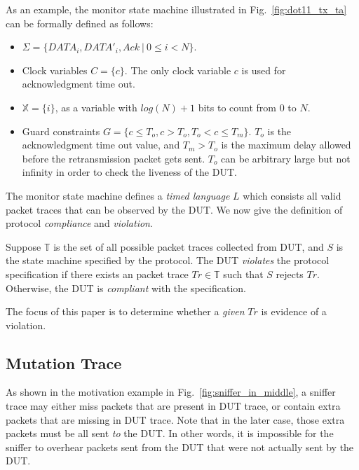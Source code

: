 As an example, the monitor state machine illustrated in
Fig.~\ref{fig:dot11_tx_ta} can be formally defined as follows:

\begin{itemize}
  \item $\Sigma = \{DATA_i, DATA'_i, Ack\ |\ 0 \le i < N\}$.
  \item Clock variables $C = \{c\}$. The only clock variable $c$ is
    used for acknowledgment time out.
  \item $\mathbb{X} = \{i\}$, as a variable with ${\mathit log}(N) + 1$ bits to count from $0$ to $N$.  
  \item Guard constraints $G = \{ c \le T_o, c > T_o, T_o < c \le T_m\}$.
    $T_o$ is the acknowledgment time out value, and $T_m >
    T_o$ is the maximum delay allowed before the retransmission packet gets
    sent. $T_o$ can be arbitrary large but not infinity in order to check the
    liveness of the DUT.
\end{itemize}


The monitor state machine defines a \textit{timed language} $L$ which consists
all valid packet traces that can be observed by the DUT.  We now give the
definition of protocol \textit{compliance} and \textit{violation}.

\begin{definition}
  Suppose $\mathbb{T}$ is the set of all possible packet traces collected from
  DUT, and $S$ is the state machine specified by the protocol. The DUT
  \textit{violates} the protocol specification if there exists an
  packet trace $Tr \in \mathbb{T}$ such that $S$ rejects $Tr$.
  Otherwise, the DUT is \textit{compliant} with the specification.
\end{definition}

The focus of this paper is to determine whether a \textit{given} $Tr$ is
evidence of a violation.
%


\subsection{Mutation Trace}
\label{subsec:mutation}

As shown in the motivation example in Fig.~\ref{fig:sniffer_in_middle}, a
sniffer trace may either miss packets that are present in DUT trace, or contain
extra packets that are missing in DUT trace. Note that in the later case, those
extra packets must be all sent \textit{to} the DUT. In other words, it is
impossible for the sniffer to overhear packets sent from the DUT that were not
actually sent by the DUT.

